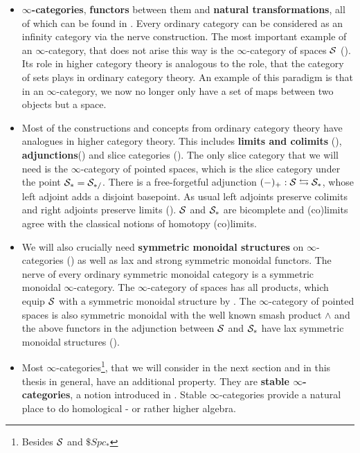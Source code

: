 \begin{itemize}
    \item \textbf{$\infty$-categories}, \textbf{functors} between them and \textbf{natural transformations}, all of which can be found in \cite[Chapter~1]{HigherToposTheory}. Every ordinary category can be considered as an infinity category via the nerve construction. The most important example of an $\infty$-category, that does not arise this way is the $\infty$-category of spaces $\mathcal{S}$ (\cite[Section~1.2.6]{HigherToposTheory}). Its role in higher category theory is analogous to the role, that the category of sets plays in ordinary category theory. An example of this paradigm is that in an $\infty$-category, we now no longer only have a set of maps between two objects but a space. 
    
    \item Most of the constructions and concepts from ordinary category theory have analogues in higher category theory. This includes \textbf{limits and colimits} (\cite[Section~1.2.3, Chapter~4]{HigherToposTheory}), \textbf{adjunctions}(\cite[\href{https://kerodon.net/tag/02EJ}{Tag 02EJ}]{kerodon}) and slice categories (\cite[Section~1.2.9]{HigherToposTheory}). The only slice category that we will need is the $\infty$-category of pointed spaces, which is the slice category under the point $\mathcal{S}_*=\mathcal{S}_{*/}$. There is a free-forgetful adjunction $(-)_+:\mathcal{S}\leftrightarrows \mathcal{S}_*$, whose left adjoint adds a disjoint basepoint. As usual left adjoints preserve colimits and right adjoints preserve limits (\cite[Proposition~5.2.3.5]{HigherToposTheory}). $\mathcal{S}$ and $\mathcal{S}_*$ are bicomplete and (co)limits agree with the classical notions of homotopy (co)limits. 
    \item We will also crucially need \textbf{symmetric monoidal structures} on $\infty$-categories (\cite[Definition~2.0.0.7]{lurie2017higher}) as well as lax and strong symmetric monoidal functors. The nerve of every ordinary symmetric monoidal category is a symmetric monoidal $\infty$-category.
    The $\infty$-category of spaces has all products, which equip $\mathcal{S}$ with a symmetric monoidal structure by \cite[Section~2.4.1]{lurie2017higher}.
    The $\infty$-category of pointed spaces is also symmetric monoidal with the well known smash product $\wedge$ and the above functors in the adjunction between $\mathcal{S}$ and $\mathcal{S}_*$ have lax symmetric monoidal structures (\cite[Theorem~2.2.2.4]{lurie2017higher}). 
    \item Most $\infty$-categories\footnote{Besides $\mathcal{S}$ and $\$Spc_*$}, that we will consider in the next section and in this thesis in general, have an additional property. They are \textbf{stable $\infty$-categories}, a notion introduced in \cite[Section~1.1]{lurie2017higher}. Stable $\infty$-categories provide a natural place to do homological - or rather higher algebra.
    
\end{itemize}
